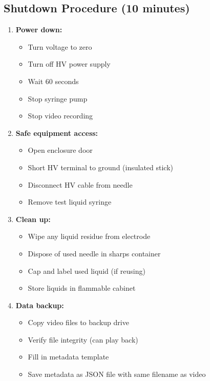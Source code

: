 \documentclass[11pt]{article}
\begin{document}
\subsection{Shutdown Procedure (10 minutes)}

\begin{enumerate}
\item \textbf{Power down:}
  \begin{itemize}
  \item Turn voltage to zero
  \item Turn off HV power supply
  \item Wait 60 seconds
  \item Stop syringe pump
  \item Stop video recording
  \end{itemize}

\item \textbf{Safe equipment access:}
  \begin{itemize}
  \item Open enclosure door
  \item Short HV terminal to ground (insulated stick)
  \item Disconnect HV cable from needle
  \item Remove test liquid syringe
  \end{itemize}

\item \textbf{Clean up:}
  \begin{itemize}
  \item Wipe any liquid residue from electrode
  \item Dispose of used needle in sharps container
  \item Cap and label used liquid (if reusing)
  \item Store liquids in flammable cabinet
  \end{itemize}

\item \textbf{Data backup:}
  \begin{itemize}
  \item Copy video files to backup drive
  \item Verify file integrity (can play back)
  \item Fill in metadata template
  \item Save metadata as JSON file with same filename as video
  \end{itemize}
\end{enumerate}
\end{document}
